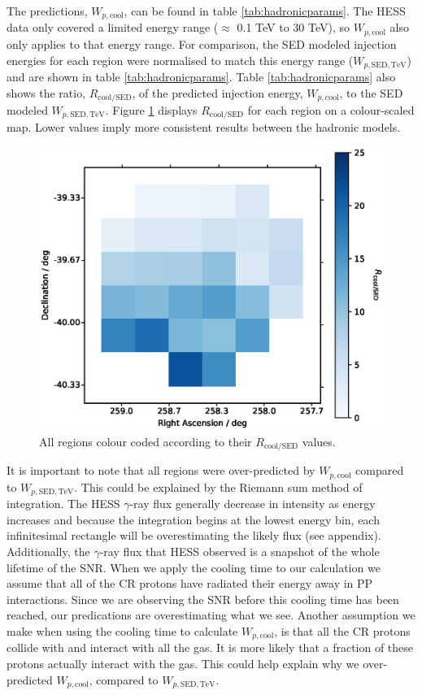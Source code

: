 \documentclass[12pt,a4paper]{article}
\begin{document}
The predictions, $W_{p,\mathrm{cool}}$, can be found in table \ref{tab:hadronicparams}. 
The HESS data only covered a limited energy range ($\approx$ 0.1 TeV to 30 TeV), so $W_{p,\mathrm{cool}}$ also only applies to that energy range. 
For comparison, the SED modeled injection energies for each region were normalised to match this energy range ($W_{p, \mathrm{SED}, \mathrm{TeV}}$) and are shown in table \ref{tab:hadronicparams}. 
Table \ref{tab:hadronicparams} also shows the ratio, $R_{\mathrm{cool/SED}}$, of the predicted injection energy, $W_{p, \mathrm{cool}}$, to the SED modeled $W_{p,\mathrm{SED}, \mathrm{TeV}}$.
Figure \ref{fig:Rmap} displays $R_{\mathrm{cool/SED}}$ for each region on a colour-scaled map. 
Lower values imply more consistent results between the hadronic models.


\begin{figure}[H]
	\centering
	\includegraphics[width=0.55\linewidth, height=0.27\textheight]{R_coolSEDmap}
	\caption{All regions colour coded according to their $R_{\mathrm{cool/SED}}$ values.}
	\label{fig:Rmap}
\end{figure}

It is important to note that all regions were over-predicted by $W_{p, \mathrm{cool}}$ compared to $W_{p, \mathrm{SED}, \mathrm{TeV}}$. This could be explained by the Riemann sum method of integration. The HESS $\gamma$-ray flux generally decrease in intensity as energy increases and because the integration begins at the lowest energy bin, each infinitesimal rectangle will be overestimating the likely flux (see appendix). Additionally, the $\gamma$-ray flux that HESS observed is a snapshot of the whole lifetime of the SNR. When we apply the cooling time to our calculation we assume that all of the CR protons have radiated their energy away in PP interactions. Since we are observing the SNR before this cooling time has been reached, our predications are overestimating what we see. Another assumption we make when using the cooling time to calculate $W_{p,\mathrm{cool}}$, is that all the CR protons collide with and interact with all the gas. It is more likely that a fraction of these protons actually interact with the gas. This could help explain why we over-predicted $W_{p,\mathrm{cool}}$, compared to $W_{p,\mathrm{SED}, \mathrm{TeV}}$. 
\end{document}
